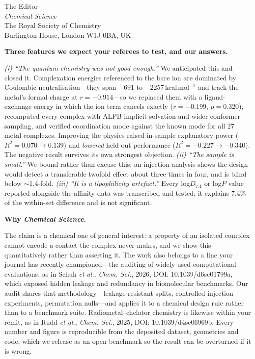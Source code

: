 \documentclass[11pt]{letter}
\providecommand{\paragraph}{}
\renewcommand{\paragraph}[1]{\par\medskip\noindent\textbf{#1}\par\nobreak\smallskip}
\begin{document}
\begin{letter}{The Editor \\
\textit{Chemical Science} \\
The Royal Society of Chemistry \\
Burlington House, London W1J 0BA, UK}
\paragraph{Three features we expect your referees to test, and our answers.}
\textit{(i) ``The quantum chemistry was not good enough.''} We anticipated this
and closed it. Complexation energies referenced to the bare ion are dominated by
Coulombic neutralisation---they span $-691$ to $-2257$\,kcal\,mol$^{-1}$ and
track the metal's formal charge at $r = -0.914$---so we replaced them with a
ligand-exchange energy in which the ion term cancels exactly
($r = -0.199$, $p = 0.320$), recomputed every complex with ALPB implicit
solvation and wider conformer sampling, and verified coordination mode against
the known mode for all 27 metal complexes. Improving the physics raised
in-sample explanatory power ($R^2 = 0.070 \rightarrow 0.139$) and \emph{lowered}
held-out performance ($R^2 = -0.227 \rightarrow -0.340$). The negative result
survives its own strongest objection.
\textit{(ii) ``The sample is small.''} We bound rather than excuse this: an
injection analysis shows the design would detect a transferable twofold effect
about three times in four, and is blind below $\sim$1.4-fold.
\textit{(iii) ``It is a lipophilicity artefact.''} Every log$D_{7.4}$ or
log$P$ value reported alongside the affinity data was transcribed and tested; it
explains 7.4\% of the within-set difference and is not significant.

\paragraph{Why \textit{Chemical Science}.}
The claim is a chemical one of general interest: a property of an isolated
complex cannot encode a contact the complex never makes, and we show this
quantitatively rather than asserting it. The work also belongs to a line your
journal has recently championed---the auditing of widely used computational
evaluations, as in Schuh \textit{et al.}, \textit{Chem. Sci.}, 2026, DOI:
10.1039/d6sc01799a, which exposed hidden leakage and redundancy in biomolecular
benchmarks. Our audit shares that methodology---leakage-resistant splits,
controlled injection experiments, permutation nulls---and applies it to a
chemical design rule rather than to a benchmark suite. Radiometal--chelator
chemistry is likewise within your remit, as in Rudd \textit{et al.},
\textit{Chem. Sci.}, 2025, DOI: 10.1039/d4sc06969b. Every number and figure is
reproducible from the deposited dataset, geometries and code, which we release
as an open benchmark so the result can be overturned if it is wrong.


\end{letter}
\end{document}
